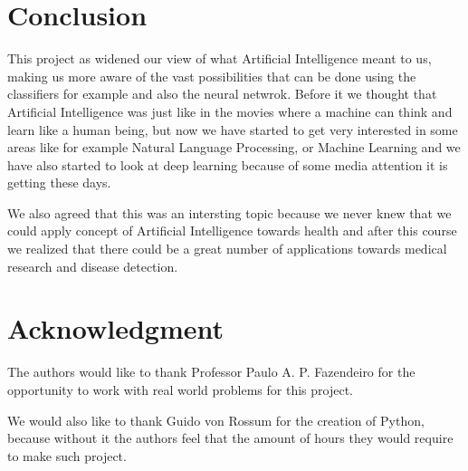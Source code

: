 \documentclass[conference]{IEEEtran}
\begin{document}
\section{Conclusion}
This project as widened our view of what Artificial Intelligence meant to us,
making us more aware of the vast possibilities that can be done using the
classifiers for example and also the neural netwrok. Before it we thought that
Artificial Intelligence was just like in the movies where a machine can think
and learn like a human being, but now we have started to get very interested in
some areas like for example Natural Language Processing, or Machine Learning and
we have also started to look at deep learning because of some media attention
it is getting these days.

We also agreed that this was an intersting topic because we never knew that we
could apply concept of Artificial Intelligence towards health and after this
course we realized that there could be a great number of applications towards
medical research and disease detection.

\section*{Acknowledgment}
The authors would like to thank Professor Paulo A. P. Fazendeiro for the
opportunity to work with real world problems for this project.

We would also like to thank Guido von Rossum for the creation of Python, because
without it the authors feel that the amount of hours they would require to make
such project.
\end{document}
